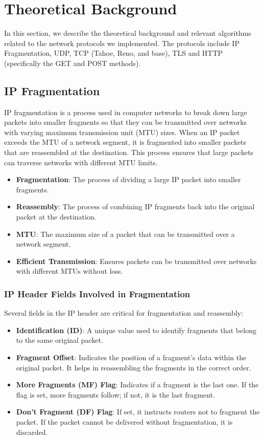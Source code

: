\chapter{Theoretical Background}

In this section, we describe the theoretical background and relevant algorithms related to the network protocols we implemented. The protocols include IP Fragmentation, UDP, TCP (Tahoe, Reno, and base), TLS and HTTP (specifically the GET and POST methods).

\section{IP Fragmentation}
IP fragmentation is a process used in computer networks to break down large packets into smaller fragments so that they can be transmitted over networks with varying maximum transmission unit (MTU) sizes. When an IP packet exceeds the MTU of a network segment, it is fragmented into smaller packets that are reassembled at the destination. This process ensures that large packets can traverse networks with different MTU limits.

\begin{itemize}
    \item \textbf{Fragmentation}: The process of dividing a large IP packet into smaller fragments.
    \item \textbf{Reassembly}: The process of combining IP fragments back into the original packet at the destination.
    \item \textbf{MTU}: The maximum size of a packet that can be transmitted over a network segment.
    \item \textbf{Efficient Transmission}: Ensures packets can be transmitted over networks with different MTUs without loss.
\end{itemize}


\subsection{IP Header Fields Involved in Fragmentation}
Several fields in the IP header are critical for fragmentation and reassembly:

\begin{itemize}
    \item \textbf{Identification (ID)}: A unique value used to identify fragments that belong to the same original packet.
    \item \textbf{Fragment Offset}: Indicates the position of a fragment's data within the original packet. It helps in reassembling the fragments in the correct order.
    \item \textbf{More Fragments (MF) Flag}: Indicates if a fragment is the last one. If the flag is set, more fragments follow; if not, it is the last fragment.
    \item \textbf{Don't Fragment (DF) Flag}: If set, it instructs routers not to fragment the packet. If the packet cannot be delivered without fragmentation, it is discarded.
\end{itemize}

